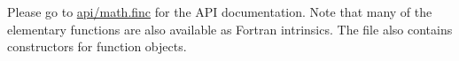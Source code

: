 Please go to \hyperlink{math_8finc}{api/math.\-finc} for the A\-P\-I documentation. Note that many of the elementary functions are also available as Fortran intrinsics. The file also contains constructors for function objects. 